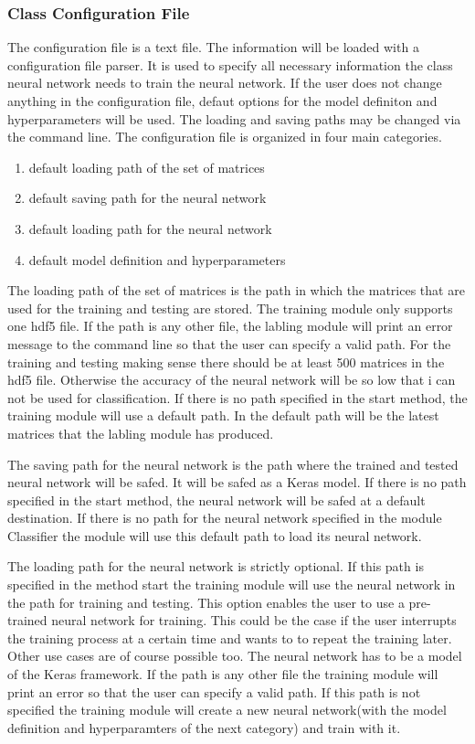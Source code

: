 \documentclass[parskip=full]{scrartcl}
\begin{document}
\subsubsection{Class Configuration File}
The configuration file is a text file. The information will be loaded with a configuration file parser.
It is used to specify all necessary information the class neural network needs to train the neural network.
If the user does not change anything in the configuration file, defaut options for the model definiton and hyperparameters will be used. The loading and saving paths may be changed via the command line. The configuration file is organized in four main categories.
\begin{enumerate}
\item default loading path of the set of matrices 
\item default saving path for the neural network
\item default loading path for the neural network
\item default model definition and hyperparameters
\end{enumerate}
The loading path of the set of matrices is the path in which the matrices that are used for the training and testing are stored.
The training module only supports one hdf5 file.
If the path is any other file, the labling module will print an error message to the command line so that the user can specify a valid path.
For the training and testing making sense there should be at least 500 matrices in the hdf5 file.
Otherwise the accuracy of the neural network will be so low that i can not be used for classification.
If there is no path specified in the start method, the training module will use a default path.
In the default path will be the latest matrices that the labling module has produced. \newline

The saving path for the neural network is the path where the trained and tested neural network will be safed.
It will be safed as a Keras model.
If there is no path specified in the start method, the neural network will be safed at a default destination.
If there is no path for the neural network specified in the module Classifier the module will use this default path to load its neural network.\newline

The loading path for the neural network is strictly optional.
If this path is specified in the method start the training module will use the neural network in the path for training and testing.
This option enables the user to use a pre-trained neural network for training.
This could be the case if the user interrupts the training process at a certain time and wants to to repeat the training later.
Other use cases are of course possible too.
The neural network has to be a model of the Keras framework. If the path is any other file the training module will print an error so that the user can specify a valid path.
If this path is not specified the training module will create a new neural network(with the model definition and hyperparamters of the next category) and train with it. \newline
\end{document}
